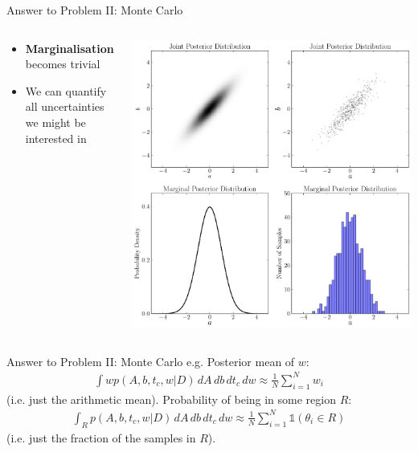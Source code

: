 \begin{frame}[t]{Answer to Problem II: Monte Carlo}
\begin{columns}[T]
\begin{column}{0.35\textwidth}
  \vspace{20pt}
  \begin{itemize}
  \setlength{\itemsep}{10pt}
  \item {\bf Marginalisation} becomes trivial
  \item We can quantify all uncertainties we might be interested in
  \end{itemize}
\end{column}
\hfill
\begin{column}{0.5\textwidth}
  \hspace{-30pt}
  \includegraphics[scale=0.22]{marginalisation.pdf}
\end{column}

\end{columns}
\end{frame}



\begin{frame}[t]{Answer to Problem II: Monte Carlo}
e.g. Posterior mean of $w$:
\begin{eqnarray}
\int w p(A, b, t_c, w | D) \, dA \, db \, dt_c \, dw
\approx \frac{1}{N}\sum_{i=1}^N w_i
\end{eqnarray}
(i.e. just the arithmetic mean). Probability of being in some region $R$:
\begin{eqnarray}
\int_R p(A, b, t_c, w | D) \, dA \, db \, dt_c \, dw
\approx \frac{1}{N}\sum_{i=1}^N \mathds{1}\left(\theta_i \in R \right)
\end{eqnarray}
(i.e. just the fraction of the samples in $R$).


\end{frame}


